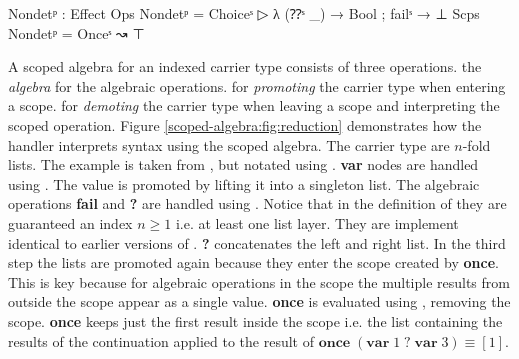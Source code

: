 \begin{code}
Nondetᵖ : Effect
Ops   Nondetᵖ = Choiceˢ  ▷ λ{ (⁇ˢ _) → Bool ; failˢ → ⊥ }
Scps  Nondetᵖ = Onceˢ    ↝ ⊤
\end{code}
A scoped algebra for an  indexed carrier type 
consists of three operations.
 the \textit{algebra} for the algebraic operations.
 for \textit{promoting} the carrier type when entering a scope.
 for \textit{demoting} the carrier type when leaving a scope and
interpreting the scoped operation.
Figure \ref{scoped-algebra:fig:reduction} demonstrates how the handler
interprets  syntax using the scoped algebra.
The carrier type are $n$-fold lists.
The example is taken from \textcite{DBLP:conf/lics/PirogSWJ18}, but notated
using
\AgdaSpace{}\AgdaSpace{}.
\textbf{var} nodes are handled using .
The value is promoted by lifting it into a singleton list.
The algebraic operations \textbf{fail} and \textbf{?} are handled using
.
Notice that in the definition of  they are guaranteed an index
$n\geqslant 1$ i.e. at least one list layer.
They are implement identical to earlier versions of .
\textbf{?} concatenates the left and right list.
In the third step the lists are promoted again because they enter the scope
created by \textbf{once}.
This is key because for algebraic operations in the scope the multiple results
from outside the scope appear as a single value.
\textbf{once} is evaluated using , removing the scope.
\textbf{once} keeps just the first result inside the scope i.e. the list
containing the results of the continuation applied to the result of
$\textbf{once}\;(\textbf{var}\;1\;?\;\textbf{var}\;3)\equiv [1]$.

